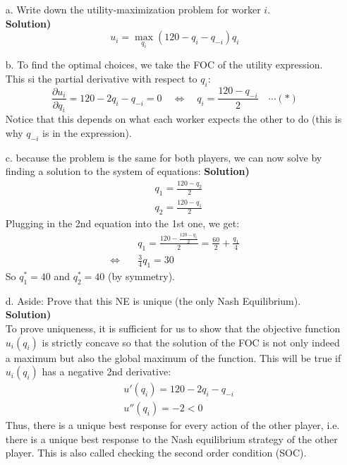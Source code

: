 \documentclass{article}
\begin{document}
    \begin{enumerate}
        \item[a.] Write down the utility-maximization problem for worker $i$.\\
        \textbf{Solution)}
        $$
        u_i=\max_{q_i}(120-q_i-q_{-i})q_i
        $$
        \item[b.] To find the optimal choices, we take the FOC of the utility expression. This si the partial derivative with respect to $q_i$:
        $$
        \frac{\partial u_i}{\partial q_i}=120-2q_i-q_{-i}=0\quad\iff\quad q_i=\frac{120-q_{-i}}{2}\quad\cdots(*)
        $$
        Notice that this depends on what each worker expects the other to do (this is why $q_{-i}$ is in the expression).
        \item[c.] because the problem is the same for both players, we can now solve by finding a solution to the system of equations:
        \textbf{Solution)}\\
        \begin{align*}
            &q_1=\frac{120-q_2}{2}\\
            &q_2=\frac{120-q_1}{2}
        \end{align*}
        Plugging in the 2nd equation into the 1st one, we get:
        \begin{align*}
            &q_1=\frac{120-\frac{120-q_1}{2}}{2}=\frac{60}{2}+\frac{q_1}{4}\\
            \iff\quad& \frac{3}{4}q_1=30
        \end{align*}
        So $q_1^*=40$ and $q_2^*=40$ (by symmetry).
        \item[d.] Aside: Prove that this NE is unique (the only Nash Equilibrium).\\
        \textbf{Solution)}\\
        To prove uniqueness, it is sufficient for us to show that the objective function $u_i(q_i)$ is strictly concave so that the solution of the FOC is not only indeed a maximum but also the global maximum of the function. This will be true if $u_i(q_i)$ has a negative 2nd derivative:
        \begin{align*}
            &u'(q_i)=120-2q_i-q_{-i}\\
            &u''(q_i)=-2<0
        \end{align*}
        Thus, there is a unique best response for every action of the other player, i.e. there is a unique best response to the Nash equilibrium strategy of the other player. This is also called checking the second order condition (SOC).

\end{enumerate}
\end{document}
